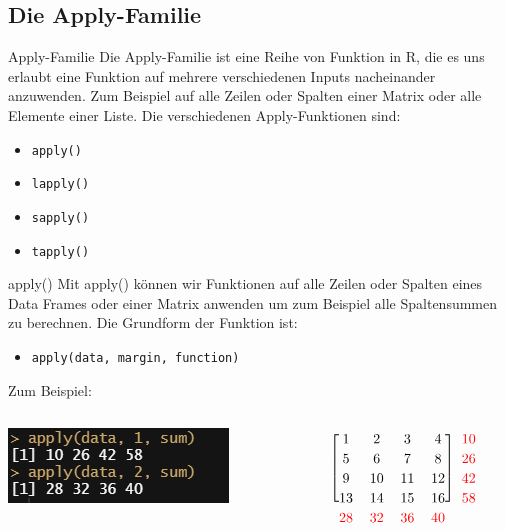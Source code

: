 \documentclass[xcolor=dvipsnames, aspectratio = 169]{beamer}
\begin{document}
\subsection*{Die Apply-Familie}

\begin{frame}[fragile]{Apply-Familie}
	Die Apply-Familie ist eine Reihe von Funktion in R, die es uns erlaubt eine Funktion auf mehrere verschiedenen Inputs nacheinander anzuwenden. Zum Beispiel auf alle Zeilen oder Spalten einer Matrix oder alle Elemente einer Liste. Die verschiedenen Apply-Funktionen sind:  
	\begin{itemize}
		\item \verb+apply()+
		\item \verb+lapply()+
		\item \verb+sapply()+
		\item \verb+tapply()+
	\end{itemize}
\end{frame}

\begin{frame}[fragile]{apply()}
	Mit apply() können wir Funktionen auf alle Zeilen oder Spalten eines Data Frames oder einer Matrix anwenden um zum Beispiel alle Spaltensummen zu berechnen. Die Grundform der Funktion ist:
	\begin{itemize}
		\item \verb+apply(data, margin, function)+
	\end{itemize}
	Zum Beispiel:
	\begin{columns}[T]
		\begin{column}{0.5\textwidth}
			\includegraphics{Apply}
		\end{column}
		\begin{column}{0.4\textwidth}
			\[
			\renewcommand\BAextrarowheight{2pt}
			\begin{blockarray}{*{5}{c}}
				\begin{block}{[*{4}{c}]{c}}
				    1 &2 &3 &4&\textcolor{red}{10}\\
				    5 &6 &7 &8&\textcolor{red}{26}\\
				    9 &10 &11 &12&\textcolor{red}{42}\\
				    13 &14 &15 &16&\textcolor{red}{58}\\
				\end{block}
				\textcolor{red}{28} & \textcolor{red}{32} & \textcolor{red}{36} & \textcolor{red}{40}
			\end{blockarray}
			\]
		\end{column}
	\end{columns}
	
\end{frame}
\end{document}
